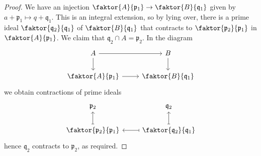\begin{proof}
    We have an injection \( \faktor{A}{\mathfrak p_1} \to \faktor{B}{\mathfrak q_1} \) given by \( a + \mathfrak p_1 \mapsto q + \mathfrak q_1 \).
    This is an integral extension, so by lying over, there is a prime ideal \( \faktor{\mathfrak q_2}{\mathfrak q_1} \) of \( \faktor{B}{\mathfrak q_1} \) that contracts to \( \faktor{\mathfrak p_2}{\mathfrak p_1} \) in \( \faktor{A}{\mathfrak p_1} \).
    We claim that \( \mathfrak q_2 \cap A = \mathfrak p_2 \).
    In the diagram
\[\begin{tikzcd}
	A & B \\
	{\faktor{A}{\mathfrak p_1}} & {\faktor{B}{\mathfrak q_1}}
	\arrow[from=1-1, to=1-2]
	\arrow[from=1-2, to=2-2]
	\arrow[from=1-1, to=2-1]
	\arrow[from=2-1, to=2-2]
\end{tikzcd}\]
    we obtain contractions of prime ideals
\[\begin{tikzcd}
	{\mathfrak p_2} & {\mathfrak q_2} \\
	{\faktor{\mathfrak p_2}{\mathfrak p_1}} & {\faktor{\mathfrak q_2}{\mathfrak q_1}}
	\arrow[maps to, from=2-2, to=1-2]
	\arrow[maps to, from=2-2, to=2-1]
	\arrow[maps to, from=2-1, to=1-1]
\end{tikzcd}\]
    hence \( \mathfrak q_2 \) contracts to \( \mathfrak p_2 \), as required.
\end{proof}
